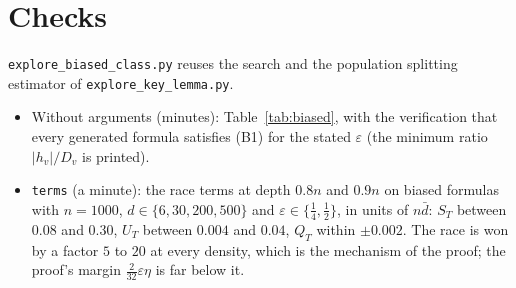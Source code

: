 \documentclass[11pt,a4paper]{article}
\theoremstyle{definition}
\theoremstyle{remark}
\begin{document}
\section{Checks}\label{sec:checks}

\texttt{explore\_biased\_class.py} reuses the search and the population
splitting estimator of \texttt{explore\_key\_lemma.py}.
\begin{itemize}
 \item Without arguments (minutes): Table~\ref{tab:biased}, with the
 verification that every generated formula satisfies (B1) for the stated
 $\varepsilon$ (the minimum ratio $|h_v|/D_v$ is printed).
 \item \texttt{terms} (a minute): the race terms at depth $0.8n$ and $0.9n$
 on biased formulas with $n=1000$, $d\in\{6,30,200,500\}$ and
 $\varepsilon\in\{\frac14,\frac12\}$, in units of $n\bar d$: $S_T$ between
 $0.08$ and $0.30$, $U_T$ between $0.004$ and $0.04$, $Q_T$ within $\pm0.002$.
 The race is won by a factor $5$ to $20$ at every density, which is the
 mechanism of the proof; the proof's margin $\frac2{32}\varepsilon\eta$ is far
 below it.
\end{itemize}
\end{document}
